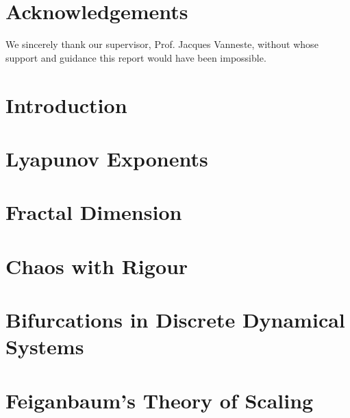 \documentclass[12pt,oneside]{report}
\begin{document}
\maketitle


\chapter*{Acknowledgements}
We sincerely thank our supervisor, Prof. Jacques Vanneste, without whose support and guidance this report would have been impossible.


\declaration
\dedication{Musa mihi causas memora ...\\
	Muse, tell me the causes ...
}

\tableofcontents
\newpage
{}

\chapter*{Introduction}


\chapter{Lyapunov Exponents}

\chapter{Fractal Dimension}


\chapter{Chaos with Rigour}\label{chapter:chaos_with_rigor}


\chapter{Bifurcations in Discrete Dynamical Systems}\label{chapter:bifurcation}


\chapter{Feiganbaum's Theory of Scaling}

\end{document}
